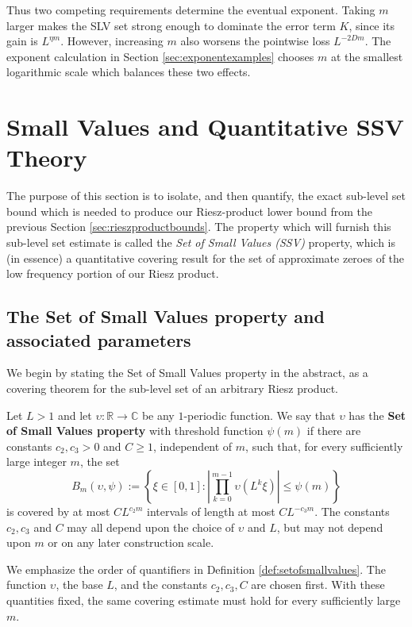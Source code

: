 \documentclass[12pt]{amsart}
\numberwithin{equation}{section}
\begin{document}
Thus two competing requirements determine the eventual exponent. Taking $m$ larger makes the SLV set strong enough to dominate the error term $K$, since its gain is $L^{\eta m}$. However, increasing $m$ also worsens the pointwise loss $L^{-2Dm}$. The exponent calculation in Section \ref{sec:exponentexamples} chooses $m$ at the smallest logarithmic scale which balances these two effects.

\section{Small Values and Quantitative SSV Theory}\label{sec:ssvtechnical}

The purpose of this section is to isolate, and then quantify, the exact sub-level set bound which is needed to produce our Riesz-product lower bound from the previous Section \ref{sec:rieszproductbounds}.  
The property which will furnish this sub-level set estimate is called the \textit{Set of Small Values (SSV)} property, which is (in essence) a quantitative covering result for the set of approximate zeroes of the low frequency portion of our Riesz product.



\subsection{The Set of Small Values property and associated parameters}\label{subsec:SSVSLV}
We begin by stating the Set of Small Values property in the abstract, as a covering theorem for the sub-level set of an arbitrary Riesz product.


\begin{definition}\label{def:setofsmallvalues}
Let $L>1$ and let $\upsilon:\mathbb R\to\mathbb C$ be any $1$-periodic function.  We say that
$\upsilon$ has the \textbf{Set of Small Values property} with threshold function $\psi(m)$ if there are
constants $c_2,c_3>0$ and $C\geq1$, independent of $m$, such that, for every
sufficiently large integer $m$, the set
\[
 B_m(\upsilon,\psi)
 :=\left\{\xi\in[0,1]:
 \left|\prod_{k=0}^{m-1}\upsilon(L^k\xi)\right|\leq\psi(m)
 \right\}
\]
is covered by at most $CL^{c_2m}$ intervals of length at most
$CL^{-c_3m}$.  The constants $c_2,c_3$ and $C$ may all depend upon the choice of $\upsilon$ and $L$, but may not depend upon $m$ or on any later construction scale.
\end{definition}

We emphasize the order of quantifiers in Definition \ref{def:setofsmallvalues}.  The function $\upsilon$, the base $L$, and the constants $c_2,c_3,C$ are chosen first.  With these quantities fixed, the same covering estimate must hold for every sufficiently large $m$.
\end{document}
